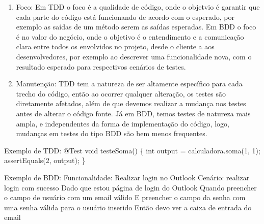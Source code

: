 \documentclass[11pt]{article}
\begin{document}
\begin{enumerate}
\item Foco: Em TDD o foco é a qualidade de código, onde o objetvio é garantir que cada parte do código está funcionando de acordo com o esperado, por exemplo as saídas de um método serem as saídas esperadas. Em BDD o foco é no valor do negócio, onde o objetivo é o entendimento e a comunicação clara entre todos os envolvidos no projeto, desde o cliente a aos desenvolvedores, por exemplo ao descrever uma funcionalidade nova, com o resultado esperado para respectivos cenários de testes.

\item Manutenção: TDD tem a natureza de ser altamente específico para cada trecho do código, então ao ocorrer qualquer alteração, os testes são diretamente afetados, além de que devemos realizar a mudança nos testes antes de alterar o código fonte. Já em BDD, temos testes de natureza mais ampla, e independentes da forma de implementação do código, logo, mudanças em testes do tipo BDD são bem menos frequentes.
\end{enumerate}

Exemplo de TDD:
     @Test
     void testeSoma() \{
         int output = calculadora.soma(1, 1);
         assertEquals(2, output);
     \}

Exemplo de BDD:
    Funcionalidade: Realizar login no Outlook
    Cenário: realizar login com sucesso
    Dado que estou página de login do Outlook
    Quando preencher o campo de usuário com um email válido
    E preencher o campo da senha com uma senha válida para o usuário inserido
    Então devo ver a caixa de entrada do email
\end{document}
